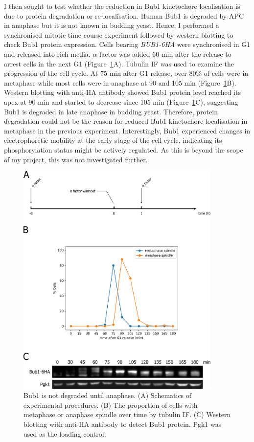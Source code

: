 I then sought to test whether the reduction in Bub1 kinetochore localisation is due to protein degradation or re-localisation. Human Bub1 is degraded by APC in anaphase \citep{Qi2007KEN-box-dependentComplex/cyclosome} but it is not known in budding yeast. Hence, I performed a synchronised mitotic time course experiment followed by western blotting to check Bub1 protein expression. Cells bearing \textit{BUB1-6HA} were synchronised in G1 and released into rich media. $\alpha$ factor was added 60 \si{\minute} after the release to arrest cells in the next G1 (Figure~\ref{fig:bub1timecourse}A). Tubulin IF was used to examine the progression of the cell cycle. At 75 \si{\minute} after G1 release, over 80\% of cells were in metaphase while most cells were in anaphase at 90 and 105 \si{\minute} (Figure~\ref{fig:bub1timecourse}B). Western blotting with anti-HA antibody showed Bub1 protein level reached its apex at 90 \si{\minute} and started to decrease since 105 \si{\minute} (Figure~\ref{fig:bub1timecourse}C), suggesting Bub1 is degraded in late anaphase in budding yeast. Therefore, protein degradation could not be the reason for reduced Bub1 kinetochore localisation in metaphase in the previous experiment. Interestingly, Bub1 experienced changes in electrophoretic mobility at the early stage of the cell cycle, indicating its phosphorylation status might be actively regulated. As this is beyond the scope of my project, this was not investigated further. 

\begin{figure}[htbp]
  \centering
  \includegraphics[width=0.9\textwidth]{chapter3/figures/Bub1-6HA time course.pdf}
  \caption[Bub1 is not degraded until anaphase]{Bub1 is not degraded until anaphase. (A) Schematics of experimental procedures. (B) The proportion of cells with metaphase or anaphase spindle over time by tubulin IF. (C) Western blotting with anti-HA antibody to detect Bub1 protein. Pgk1 was used as the loading control.}
  \label{fig:bub1timecourse}
\end{figure} 

